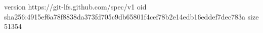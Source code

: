 version https://git-lfs.github.com/spec/v1
oid sha256:4915ef6a78f8838da373fd705c9db65801f4cef78b2e14edb16eddef7dec783a
size 51354

